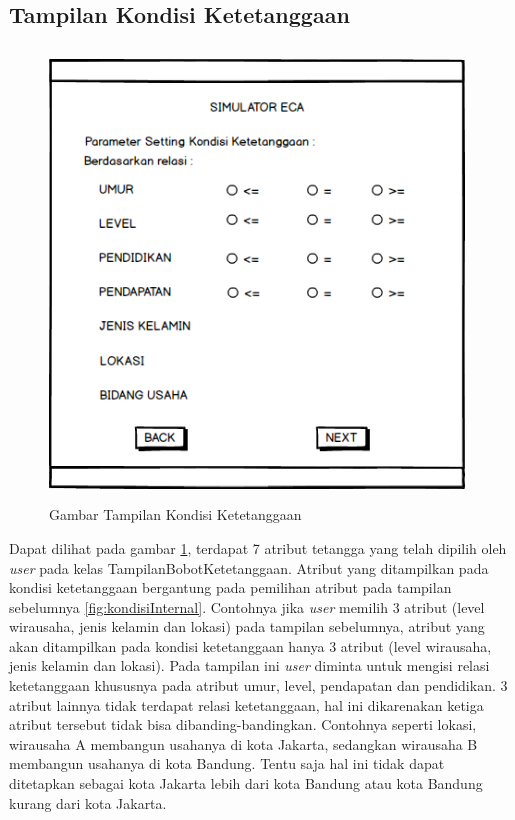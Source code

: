 \subsection{Tampilan Kondisi Ketetanggaan}

\begin{figure} [H]
	\centering  
	\includegraphics[width=11cm, height=12cm]{mockup2} 
	\caption[Gambar Tampilan Kondisi Ketetanggaan]{Gambar Tampilan Kondisi Ketetanggaan}
	\label{fig:kondisiTetangga} 
\end{figure}

Dapat dilihat pada gambar \ref{fig:kondisiTetangga}, terdapat 7 atribut tetangga yang telah dipilih oleh \textit{user} pada kelas TampilanBobotKetetanggaan. Atribut yang ditampilkan pada kondisi ketetanggaan bergantung pada pemilihan atribut pada tampilan sebelumnya \ref{fig:kondisiInternal}. Contohnya jika \textit{user} memilih 3 atribut (level wirausaha, jenis kelamin dan lokasi) pada tampilan sebelumnya, atribut yang akan ditampilkan pada kondisi ketetanggaan hanya 3 atribut (level wirausaha, jenis kelamin dan lokasi). Pada tampilan ini \textit{user} diminta untuk mengisi relasi ketetanggaan khususnya pada atribut umur, level, pendapatan dan pendidikan. 3 atribut lainnya tidak terdapat relasi ketetanggaan, hal ini dikarenakan ketiga atribut tersebut tidak bisa dibanding-bandingkan. Contohnya seperti lokasi, wirausaha A membangun usahanya di kota Jakarta, sedangkan wirausaha B membangun usahanya di kota Bandung. Tentu saja hal ini tidak dapat ditetapkan sebagai kota Jakarta lebih dari kota Bandung atau kota Bandung kurang dari kota Jakarta.

